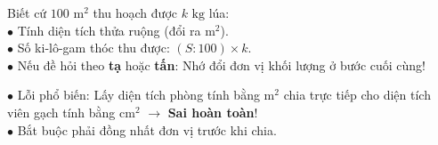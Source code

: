 \documentclass[14pt,a4paper,oneside]{extbook}
\begin{document}
\noindent
\begin{minipage}[t]{0.54\textwidth}
  \begin{tcolorbox}[
    enhanced,
    title={\footnotesize\bfseries\color{white}\faSeedling\ Dạng toán năng suất cây trồng},
    colback=green!3!white,
    colframe=green!60!black,
    arc=2.5mm, boxrule=0.8pt, top=1.8mm, bottom=1.8mm, left=2.2mm, right=2.2mm
  ]
    \footnotesize
    Biết cứ $100\text{ m}^2$ thu hoạch được $k\text{ kg}$ lúa:\\
    $\bullet$ Tính diện tích thửa ruộng (đổi ra $\text{m}^2$).\\
    $\bullet$ Số ki-lô-gam thóc thu được: $(S : 100) \times k$.\\
    $\bullet$ Nếu đề hỏi theo \textbf{tạ} hoặc \textbf{tấn}: Nhớ đổi đơn vị khối lượng ở bước cuối cùng!
  \end{tcolorbox}
\end{minipage}%
\hfill
\begin{minipage}[t]{0.44\textwidth}
  \begin{tcolorbox}[
    enhanced,
    title={\footnotesize\bfseries\color{white}\faExclamationTriangle\ Mẹo tránh bẫy trắc nghiệm},
    colback=red!2!white,
    colframe=red!70!black,
    arc=2.5mm, boxrule=0.8pt, top=1.8mm, bottom=1.8mm, left=2.2mm, right=2.2mm
  ]
    \footnotesize
    $\bullet$ Lỗi phổ biến: Lấy diện tích phòng tính bằng $\text{m}^2$ chia trực tiếp cho diện tích viên gạch tính bằng $\text{cm}^2$ $\rightarrow$ \textbf{Sai hoàn toàn}!\\
    $\bullet$ Bắt buộc phải đồng nhất đơn vị trước khi chia.
  \end{tcolorbox}
\end{minipage}
\end{document}
